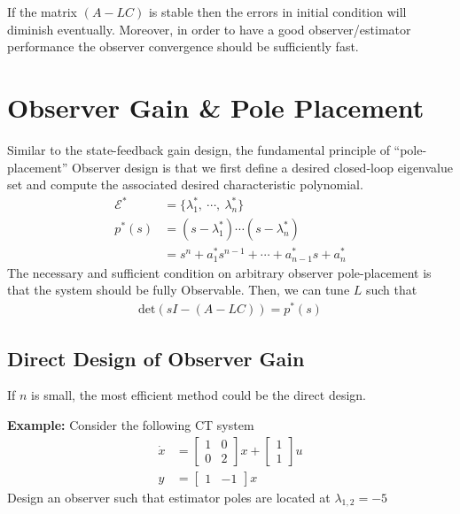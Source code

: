 \documentclass[twoside]{article}
\begin{document}
If the matrix $\left( A - L C \right)$ is stable then the errors in
initial condition will diminish eventually. Moreover, in order
to have a good observer/estimator performance the observer
convergence should be sufficiently fast. 

\newpage

\section*{Observer Gain \& Pole Placement}

Similar to the state-feedback gain design,
the fundamental principle of ``pole-placement'' Observer design is that
we first define a desired closed-loop eigenvalue set and 
compute the associated desired characteristic polynomial. 
%
\begin{align*}
 \mathcal{E}^* &= \lbrace \lambda_1^* , \ \cdots, \  \lambda_n^*
                 \rbrace
  \\
  p^*(s) &= \left( s - \lambda_1^* \right) \cdots \left( s - \lambda_n^*
         \right)                         
  \\
  &= s^n + a_1^* s^{n-1} + \cdots + a_{n-1}^* s + a_n^*
\end{align*}
%
The necessary and sufficient condition on arbitrary observer pole-placement
is that the system should be fully Observable. Then, we can tune $L$ such
that 
%
\begin{align*}
  \mathrm{det} \left( s I - ( A - L C ) \right) = p^*(s)
\end{align*}
%
\subsection*{Direct Design of Observer Gain}

If $n$ is small, the most efficient method could be the direct
design. 

\textbf{Example:} Consider the following CT system
%
\begin{align*}
 \dot{x} &= \left[ \begin{array}{cc} 1 & 0 \\ 0 & 2 \end{array} \right] x
    + \left[ \begin{array}{c} 1 \\ 1 \end{array} \right] u
\\
 y &= \left[ \begin{array}{cc} 1 & -1 \end{array} \right] x
\end{align*}
% 
Design an observer such that estimator poles are located at 
$\lambda_{1,2} = -5$
\end{document}
